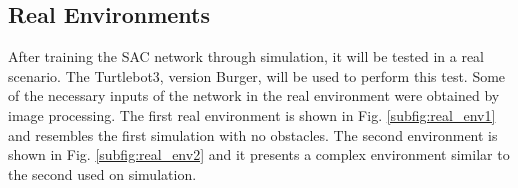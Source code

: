 
\subsection{Real Environments}

After training the SAC network through simulation, it will be tested in a real scenario.
The Turtlebot3, version Burger, will be used to perform this test.
Some of the necessary inputs of the network in the real environment were obtained by image processing.
The first real environment is shown in Fig. \ref{subfig:real_env1} and resembles the first simulation with no obstacles. The second environment is shown in Fig. \ref{subfig:real_env2} and it presents a complex environment similar to the second used on simulation.

